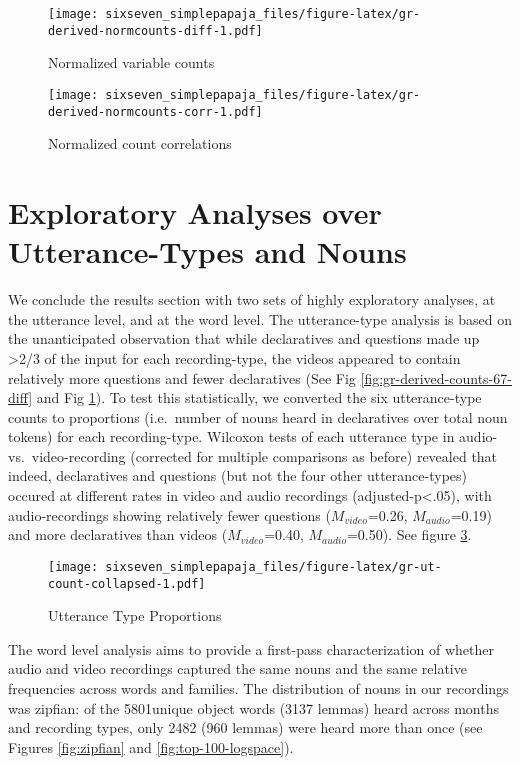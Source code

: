 \documentclass[floatsintext,man]{apa6}
\theoremstyle{definition}
\theoremstyle{definition}
\theoremstyle{definition}
\theoremstyle{remark}
\begin{document}
\begin{figure}
\centering
\texttt{[image: sixseven\_simplepapaja\_files/figure-latex/gr-derived-normcounts-diff-1.pdf]}
\caption{\label{fig:gr-derived-normcounts-diff}Normalized variable counts}
\end{figure}

\begin{figure}
\centering
\texttt{[image: sixseven\_simplepapaja\_files/figure-latex/gr-derived-normcounts-corr-1.pdf]}
\caption{\label{fig:gr-derived-normcounts-corr}Normalized count
correlations}
\end{figure}

\section{Exploratory Analyses over Utterance-Types and
Nouns}\label{exploratory-analyses-over-utterance-types-and-nouns}

We conclude the results section with two sets of highly exploratory
analyses, at the utterance level, and at the word level. The
utterance-type analysis is based on the unanticipated observation that
while declaratives and questions made up \textgreater{}2/3 of the input
for each recording-type, the videos appeared to contain relatively more
questions and fewer declaratives (See Fig
\ref{fig:gr-derived-counts-67-diff} and Fig
\ref{fig:gr-derived-normcounts-diff}). To test this statistically, we
converted the six utterance-type counts to proportions (i.e.~number of
nouns heard in declaratives over total noun tokens) for each
recording-type. Wilcoxon tests of each utterance type in audio-
vs.~video-recording (corrected for multiple comparisons as before)
revealed that indeed, declaratives and questions (but not the four other
utterance-types) occured at different rates in video and audio
recordings (adjusted-p\textless{}.05), with audio-recordings showing
relatively fewer questions (\(M_{video}\)=0.26, \(M_{audio}\)=0.19) and
more declaratives than videos (\(M_{video}\)=0.40, \(M_{audio}\)=0.50).
See figure \ref{fig:gr-ut-count-collapsed}.

\begin{figure}
\centering
\texttt{[image: sixseven\_simplepapaja\_files/figure-latex/gr-ut-count-collapsed-1.pdf]}
\caption{\label{fig:gr-ut-count-collapsed}Utterance Type Proportions}
\end{figure}

The word level analysis aims to provide a first-pass characterization of
whether audio and video recordings captured the same nouns and the same
relative frequencies across words and families. The distribution of
nouns in our recordings was zipfian: of the 5801unique object words
(3137 lemmas) heard across months and recording types, only 2482 (960
lemmas) were heard more than once (see Figures \ref{fig:zipfian} and
\ref{fig:top-100-logspace}).
\end{document}
